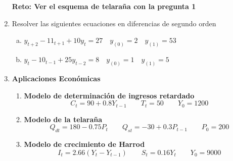 \documentclass[11pt,a4paper]{article}
\begin{document}
\begin{enumerate}
\begin{multicols}{2}
\begin{enumerate}[a)]
				\end{enumerate}
			\end{multicols}
			\textbf{Reto: Ver el esquema de telaraña con la pregunta 1}
		\item Resolver las siguientes ecuaciones en diferencias de segundo orden
				\begin{enumerate}[a)]
					\item $y_{t+2}-11_{t+1}+10y_{t}=27 \quad y_{(0)}=2 \quad y_{(1)} = 53$ %
					\item $y_{t}-10_{t-1}+25y_{t-2}=8 \quad y_{(0)}=1 \quad y_{(1)} = 5$ %
				\end{enumerate}
		\item \textbf{Aplicaciones Económicas}
			\begin{enumerate}
				\item \textbf{Modelo de determinación de ingresos retardado}
					$$C_t=90+0.8Y_{t-1} \qquad T_t=50 \qquad Y_0 = 1200$$
				\item \textbf{Modelo de la telaraña}
					$$Q_{dt}=180-0.75P_t \qquad Q_{st}=-30+0.3P_{t-1} \qquad P_{0}=200$$
				\item \textbf{Modelo de crecimiento de Harrod}
					$$I_t=2.66(Y_t-Y_{t-1}) \qquad S_t = 0.16Y_t \qquad Y_0=9000$$
			\end{enumerate}
\end{enumerate}
\end{document}

